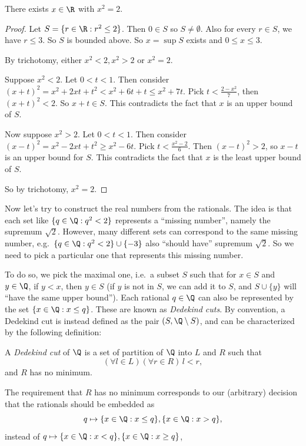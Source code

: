 \documentclass[a4paper]{article}
\begin{document}
\begin{thm}
  There exists $x\in \R$ with $x^2 = 2$.
\end{thm}

\begin{proof}
  Let $S = \{r\in \R: r^2 \leq 2\}$. Then $0\in S$ so $S\not= \emptyset$. Also for every $r \in S$, we have $r \leq 3$. So $S$ is bounded above. So $x = \sup S$ exists and $0\leq x \leq 3$.

  By trichotomy, either $x^2 < 2, x^2 > 2$ or $x^2 = 2$.

  Suppose $x^2 < 2$. Let $0 < t < 1$. Then consider $(x + t)^2 = x^2 + 2xt + t^2 < x^2 + 6t + t \leq x^2 + 7t$. Pick $t < \frac{2 - x^2}{7}$, then $(x + t)^2 < 2$. So $x + t \in S$. This contradicts the fact that $x$ is an upper bound of $S$.

  Now suppose $x^2 > 2$. Let $0 < t < 1$. Then consider $(x - t)^2 = x^2 - 2xt + t^2 \geq x^2 - 6t$. Pick $t < \frac{x^2 - 2}{6}$. Then $(x - t)^2 > 2$, so $x - t$ is an upper bound for $S$. This contradicts the fact that $x$ is the least upper bound of $S$.

  So by trichotomy, $x^2 = 2$.
\end{proof}

Now let's try to construct the real numbers from the rationals. The idea is that each set like $\{q\in \Q: q^2 < 2\}$ represents a ``missing number'', namely the supremum $\sqrt{2}$. However, many different sets can correspond to the same missing number, e.g.\ $\{q \in \Q: q^2 < 2\} \cup \{-3\}$ also ``should have'' supremum $\sqrt{2}$. So we need to pick a particular one that represents this missing number.

To do so, we pick the maximal one, i.e.\ a subset $S$ such that for $x \in S$ and $y \in \Q$, if $y < x$, then $y \in S$ (if $y$ is not in $S$, we can add it to $S$, and $S \cup \{y\}$ will ``have the same upper bound''). Each rational $q \in \Q$ can also be represented by the set $\{x \in \Q: x \leq q\}$. These are known as \emph{Dedekind cuts}. By convention, a Dedekind cut is instead defined as the pair $(S, \Q \setminus S)$, and can be characterized by the following definition:

\begin{defi}
  A \emph{Dedekind cut} of $\Q$ is a set of partition of $\Q$ into $L$ and $R$ such that
  \[
    (\forall l\in L)(\forall r\in R)\,l < r,
  \]
  and $R$ has no minimum.
\end{defi}
The requirement that $R$ has no minimum corresponds to our (arbitrary) decision that the rationals should be embedded as
\[
  q\mapsto \{x\in \Q: x \leq q\}, \{x\in \Q: x> q\},
\]
instead of $q\mapsto \{x\in \Q: x < q\}, \{x\in \Q: x \geq q\}$,
\end{document}
